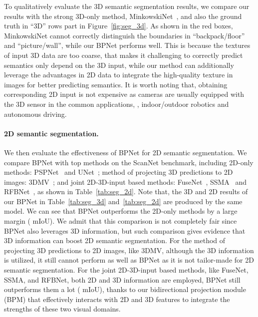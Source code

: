 \documentclass[final]{cvpr}
\begin{document}
To qualitatively evaluate the 3D semantic segmentation results, we compare our results with the strong 3D-only method, MinkowskiNet~\cite{choy20194d}, and also the ground truth in ``3D'' rows part in Figure~\ref{fig:seg_3d}.
As shown in the red boxes, MinkowskiNet cannot correctly distinguish the boundaries in ``backpack/floor'' and ``picture/wall'', while our BPNet performs well.
This is because the textures of input 3D data are too coarse, that makes it challenging to correctly predict semantics only depend on the 3D input, while our method can additionally leverage the advantages in 2D data to integrate the high-quality texture in images for better predicting semantics.
It is worth noting that, obtaining corresponding 2D input is not expensive as cameras are usually equipped with the 3D sensor in the common applications, \eg, indoor/outdoor robotics and autonomous driving.


\vspace{-4mm}
\paragraph{2D semantic segmentation.}
We then evaluate the effectiveness of BPNet for 2D semantic segmentation.
We compare BPNet with top methods on the ScanNet benchmark, including 2D-only methods: PSPNet~\cite{zhao2017pyramid} and UNet~\cite{ronneberger2015u}; method of projecting 3D predictions to 2D images: 3DMV~\cite{dai20183dmv}; and joint 2D-3D-input based methods: FuseNet~\cite{hazirbas2016fusenet}, SSMA~\cite{valada2019self} and RFBNet~\cite{deng2019rfbnet}, as shown in Table~\ref{tab:seg_2d}.
Note that, the 3D and 2D results of our BPNet in Table~\ref{tab:seg_3d} and~\ref{tab:seg_2d} are produced by the same model.
We can see that BPNet outperforms the 2D-only methods by a large margin ( mIoU).
We admit that this comparison is not completely fair since BPNet also leverages 3D information, but such comparison gives evidence that 3D information can boost 2D semantic segmentation.
For the method of projecting 3D predictions to 2D images, like 3DMV, although the 3D information is utilized, it still cannot perform as well as BPNet as it is not tailor-made for 2D semantic segmentation.
For the joint 2D-3D-input based methods, like FuseNet, SSMA, and RFBNet, both 2D and 3D information are employed, BPNet still outperforms them a lot ( mIoU), thanks to our bidirectional projection module (BPM) that effectively interacts with 2D and 3D features to integrate the strengths of these two visual domains.
\end{document}
